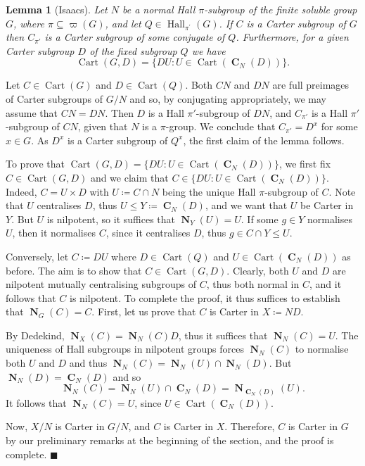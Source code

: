 \documentclass[a4paper,12pt,reqno]{amsart}
\newtheorem{lemma}[theorem]{Lemma}
\numberwithin{equation}{section}
\DeclareMathOperator{\N}{\mathbf{N}}
\DeclareMathOperator{\Hall}{Hall}
\DeclareMathOperator{\cart}{Cart}
\DeclareMathOperator{\cent}{\mathbf{C}}
\renewcommand{\leq}{\leqslant}
\newenvironment{proofof}{{\bf {Proof.} }}{\hfill $\blacksquare$ \\}
\begin{document}
\begin{lemma}[Isaacs]\label{Lem:normalhall-Isaacs}
Let $N$ be a normal Hall $\pi$-subgroup of the finite soluble group $G$,
where $\pi \subseteq \varpi(G)$, 
and let $Q \in \Hall_{\pi^{\prime}}(G)$. 
If $C$ is a Carter subgroup of $G$ then $C_{\pi'}$ is a  Carter subgroup of some conjugate of $Q$. 
Furthermore, for a given Carter subgroup $D$ of the fixed subgroup $Q$ 
we have 
\[
\cart(G, D) = \{ DU : U \in \cart(\cent_N(D))\}.
\]

\end{lemma}
\begin{proofof}
Let $C \in \cart (G)$ and $D \in \cart(Q)$.  Both $CN$ and $DN$ are full preimages of Carter subgroups of $G/N$ and so, by conjugating appropriately, we may assume that $CN=DN$. Then $D$ is a Hall  $\pi'$-subgroup of $DN$,  and $C_{\pi'}$ is a Hall  $\pi'$-subgroup of $CN$, given that $N$ is a $\pi$-group. 
We conclude that $C_{\pi'}= D^x$ for some $x \in G$. As  $D^x$ is a Carter subgroup of $Q^x$, 
the first claim of the lemma follows.  

To prove that $\cart(G, D)=   \{ DU : U \in \cart(\cent_N(D))\}$, 
we first fix   $C \in \cart (G, D)$ and we claim that $C \in  \{ DU : U \in \cart(\cent_N(D))\}$. Indeed, $C = U \times D$ with $U \coloneqq C \cap N$ being the unique Hall $\pi$-subgroup of $C$. Note that $U$ centralises $D$, thus $U \leq Y \coloneqq \cent_N(D)$, and we want that $U$ be Carter in $Y$. But $U$ is nilpotent, so it suffices that $\N_Y(U) = U$. If some $g \in Y$ normalises $U$, then it normalises $C$, since it centralises $D$, thus $g \in C \cap Y \leq U$.

Conversely, let $C \coloneqq DU$ where  $D \in \cart(Q)$ and  $U \in \cart(\cent_N(D))$  as before. The aim is to show that $C \in \cart(G, D)$.   Clearly, both $U$ and $D$ are nilpotent mutually centralising subgroups of $C$, thus both normal in $C$, and it follows that $C$ is nilpotent. To complete the proof, it thus suffices to establish that $\N_G(C) = C$. 
First, let us prove that $C$ is Carter in $X \coloneqq ND$. 

By Dedekind, $\N_X(C) = \N_N(C)D$, thus it suffices that $\N_N(C) = U$. 
The uniqueness of Hall subgroups in nilpotent groups 
forces $\N_N(C)$ to normalise both $U$ and $D$ and thus $\N_N(C) = \N_N(U ) \cap \N_N(D)$. 
But  $\N_N(D) = \cent_N(D)$
and so
\[
\N_N(C) =  \N_N(U ) \cap \cent_N(D)= \N_{\cent_N(D)}(U). 
\]
It follows that $\N_N(C)= U$,  since  $U \in \cart(\cent_N(D))$. 

Now, $X/N$ is Carter in $G/N$, and $C$ is Carter in $X$. 
Therefore, $C$ is Carter in $G$ by our preliminary remarks at the beginning of the section, 
and the proof is complete.
\end{proofof}
\end{document}
